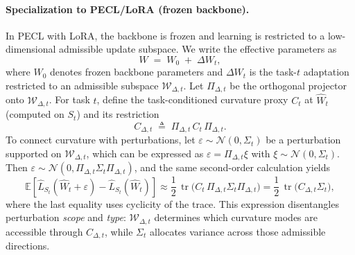 \documentclass{article}
\theoremstyle{plain}
\theoremstyle{definition}
\theoremstyle{remark}
\begin{document}
\paragraph{Specialization to PECL/LoRA (frozen backbone).}
In PECL with LoRA, the backbone is frozen and learning is restricted to a low-dimensional admissible update subspace. We write the effective parameters as
$$
W\;=\;W_0\;+\;\Delta W_t,
$$
where $W_0$ denotes frozen backbone parameters and $\Delta W_t$ is the task-$t$ adaptation restricted to an admissible subspace $\mathcal W_{\Delta,t}$. Let $\Pi_{\Delta,t}$ be the orthogonal projector onto $\mathcal W_{\Delta,t}$. For task $t$, define the task-conditioned curvature proxy $C_t$ at $\hat W_t$ (computed on $S_t$) and its restriction
$$
C_{\Delta,t}
\;\triangleq\;
\Pi_{\Delta,t}\,C_t\,\Pi_{\Delta,t}.
$$
To connect curvature with perturbations, let $\varepsilon\sim\mathcal N(0,\Sigma_t)$ be a perturbation supported on $\mathcal W_{\Delta,t}$, which can be expressed as $\varepsilon=\Pi_{\Delta,t}\xi$ with $\xi\sim\mathcal N(0,\Sigma_t)$. Then $\varepsilon\sim\mathcal N(0,\Pi_{\Delta,t}\Sigma_t\Pi_{\Delta,t})$, and the same second-order calculation yields
$$
\mathbb E\!\left[\hat L_{S_t}(\hat W_t+\varepsilon)-\hat L_{S_t}(\hat W_t)\right]
\approx
\frac12\,\operatorname{tr}\!\Big(C_t\,\Pi_{\Delta,t}\Sigma_t\Pi_{\Delta,t}\Big)
=
\frac12\,\operatorname{tr}\!\big(C_{\Delta,t}\Sigma_t\big),
$$
where the last equality uses cyclicity of the trace. This expression disentangles perturbation \emph{scope} and \emph{type}: $\mathcal W_{\Delta,t}$ determines which curvature modes are accessible through $C_{\Delta,t}$, while $\Sigma_t$ allocates variance across those admissible directions.
\end{document}
